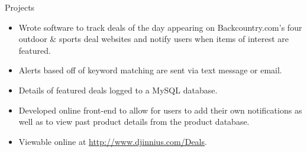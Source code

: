 \begin{category}{Projects}
\begin{itemize}
\item Wrote software to track deals of the day appearing on Backcountry.com's four outdoor \& sports deal websites and notify users when items of interest are featured.
\item Alerts based off of keyword matching are sent via text message or email.
\item Details of featured deals logged to a MySQL database. 
\item Developed online front-end to allow for users to add their own notifications as well as to view past product details from the product database.
\item Viewable online at \href{ http://www.djinnius.com/Deals/ }{http://www.djinnius.com/Deals}.
\end{itemize}



\end{category}
